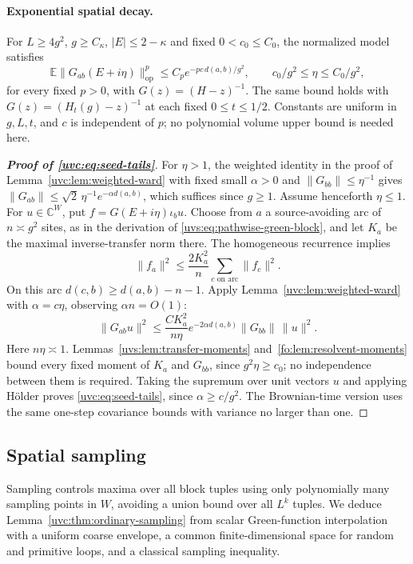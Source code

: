 \documentclass[11pt]{article}
\numberwithin{equation}{section}
\theoremstyle{remark}
\newcommand{\E}{\mathbb E}
\newcommand{\C}{\mathbb C}
\newcommand{\op}{\mathrm{op}}
\begin{document}
\paragraph{Exponential spatial decay.}
For $L\ge4g^2$, $g\ge C_\kappa$,
$|E|\le2-\kappa$ and fixed $0<c_0\le C_0$, the normalized model satisfies
\begin{equation}\label{uvc:eq:seed-tails}
 \E\|G_{ab}(E+i\eta)\|_{\op}^p
 \le C_p e^{-pc\,d(a,b)/g^2},\qquad
 c_0/g^2\le\eta\le C_0/g^2,
\end{equation}
for every fixed $p>0$, with $G(z)=(H-z)^{-1}$. The same bound holds
with $G(z)=(H_t(g)-z)^{-1}$ at each fixed $0\le t\le1/2$.
Constants are uniform in $g,L,t$, and $c$ is independent of $p$;
no polynomial volume upper bound is needed here.
\begin{proof}[\textbf{Proof of \eqref{uvc:eq:seed-tails}}]
For $\eta>1$, the weighted identity in the proof of
Lemma~\ref{uvc:lem:weighted-ward} with fixed
small $\alpha>0$ and $\|G_{bb}\|\le\eta^{-1}$ gives
$\|G_{ab}\|\le\sqrt2\,\eta^{-1}e^{-\alpha d(a,b)}$, which suffices since $g\ge1$.
Assume henceforth $\eta\le1$. For $u\in\C^W$, put $f=G(E+i\eta)\iota_bu$.
Choose from $a$ a source-avoiding arc of $n\asymp g^2$ sites,
as in the derivation of \eqref{uvs:eq:pathwise-green-block}, and let $K_a$ be the maximal
inverse-transfer norm there.  The homogeneous recurrence implies
\[
 \|f_a\|^2\le\frac{2K_a^2}{n}\sum_{c\text{ on arc}}\|f_c\|^2.
\]
On this arc $d(c,b)\ge d(a,b)-n-1$.  Apply Lemma~\ref{uvc:lem:weighted-ward}
with $\alpha=c\eta$, observing $\alpha n=O(1)$:
\[
 \|G_{ab}u\|^2
 \le \frac{C K_a^2}{n\eta}
       e^{-2\alpha d(a,b)}\|G_{bb}\|\,\|u\|^2.
\]
Here $n\eta\asymp1$. Lemmas~\ref{uvs:lem:transfer-moments}
and~\ref{fo:lem:resolvent-moments} bound every fixed moment of
$K_a$ and $G_{bb}$, since $g^2\eta\ge c_0$;
no independence between them is required.
Taking the supremum over unit vectors $u$ and applying H\"older proves
\eqref{uvc:eq:seed-tails}, since $\alpha\ge c/g^2$.
The Brownian-time version uses the same one-step covariance bounds
with variance no larger than one.
\end{proof}

\subsection{Spatial sampling}
\label{app:uniform-compression}
Sampling controls maxima over all block tuples using only polynomially
many sampling points in $W$, avoiding a union bound over all $L^k$ tuples.
We deduce Lemma~\ref{uvc:thm:ordinary-sampling} from scalar Green-function
interpolation with a uniform coarse envelope, a common finite-dimensional
space for random and primitive loops, and a classical sampling inequality.
\end{document}
